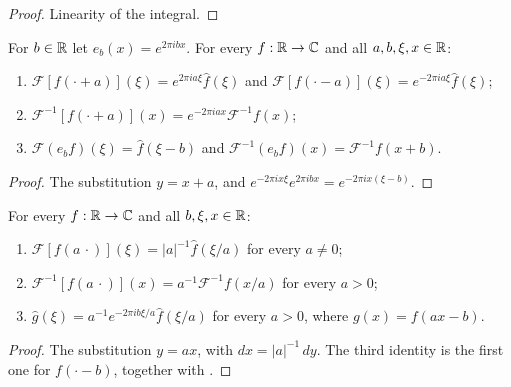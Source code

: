 \begin{proof}
\leanok
Linearity of the integral.
\end{proof}

\begin{lemma}
\label{lem:daub-fourier-translate}
\leanok
For $b \in \mathbb{R}$ let $e_b(x) = e^{2\pi i b x}$. For every $f : \mathbb{R} \to \mathbb{C}$ and all
$a, b, \xi, x \in \mathbb{R}$:
\begin{enumerate}
  \item $\mathcal F[f(\cdot + a)](\xi) = e^{2\pi i a \xi} \widehat f(\xi)$ and
    $\mathcal F[f(\cdot - a)](\xi) = e^{-2\pi i a \xi} \widehat f(\xi)$;
  \item $\mathcal F^{-1}[f(\cdot + a)](x) = e^{-2\pi i a x} \mathcal F^{-1} f(x)$;
  \item $\mathcal F(e_b f)(\xi) = \widehat f(\xi - b)$ and
    $\mathcal F^{-1}(e_b f)(x) = \mathcal F^{-1} f(x + b)$.
\end{enumerate}
\end{lemma}

\begin{proof}
\leanok
The substitution $y = x + a$, and $e^{-2\pi i x \xi} e^{2\pi i b x} = e^{-2\pi i x (\xi - b)}$.
\end{proof}

\begin{lemma}[Dilation]
\label{lem:daub-fourier-dilate}
\leanok
For every $f : \mathbb{R} \to \mathbb{C}$ and all $b, \xi, x \in \mathbb{R}$:
\begin{enumerate}
  \item $\mathcal F[f(a\,\cdot)](\xi) = |a|^{-1} \widehat f(\xi / a)$ for every $a \neq 0$;
  \item $\mathcal F^{-1}[f(a\,\cdot)](x) = a^{-1} \mathcal F^{-1} f(x / a)$ for every $a > 0$;
  \item $\widehat g(\xi) = a^{-1} e^{-2\pi i b \xi / a} \widehat f(\xi / a)$ for every $a > 0$,
    where $g(x) = f(ax - b)$.
\end{enumerate}
\end{lemma}

\begin{proof}
\leanok
{}
The substitution $y = ax$, with $dx = |a|^{-1} \, dy$. The third identity is the first one for
$f(\cdot - b)$, together with .
\end{proof}

